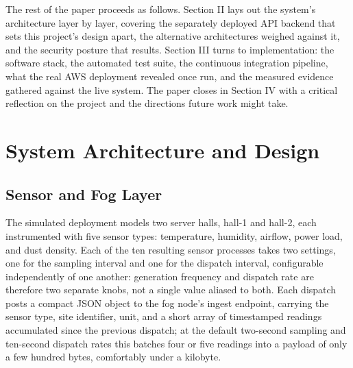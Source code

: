\documentclass[conference]{IEEEtran}
\begin{document}
The rest of the paper proceeds as follows. Section II lays out the system's architecture layer by layer, covering the separately deployed API backend that sets this project's design apart, the alternative architectures weighed against it, and the security posture that results. Section III turns to implementation: the software stack, the automated test suite, the continuous integration pipeline, what the real AWS deployment revealed once run, and the measured evidence gathered against the live system. The paper closes in Section IV with a critical reflection on the project and the directions future work might take.

\section{System Architecture and Design}

\subsection{Sensor and Fog Layer}
The simulated deployment models two server halls, hall-1 and hall-2, each instrumented with five sensor types: temperature, humidity, airflow, power load, and dust density. Each of the ten resulting sensor processes takes two settings, one for the sampling interval and one for the dispatch interval, configurable independently of one another: generation frequency and dispatch rate are therefore two separate knobs, not a single value aliased to both. Each dispatch posts a compact JSON object to the fog node's ingest endpoint, carrying the sensor type, site identifier, unit, and a short array of timestamped readings accumulated since the previous dispatch; at the default two-second sampling and ten-second dispatch rates this batches four or five readings into a payload of only a few hundred bytes, comfortably under a kilobyte.
\end{document}
